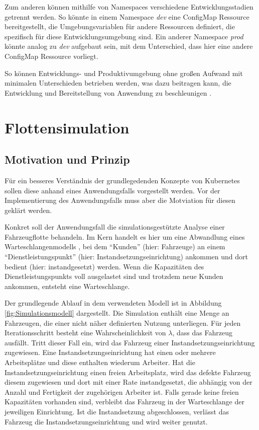 \documentclass[11pt,a4paper]{article}
\begin{document}
Zum anderen können mithilfe von Namespaces verschiedene Entwicklungsstadien getrennt werden.
So könnte in einem Namespace \emph{dev} eine ConfigMap Ressource bereitgestellt,
die Umgebungsvariablen für andere Ressourcen definiert, die spezifisch für diese 
Entwicklungsumgebung sind. Ein anderer Namespace \emph{prod} könnte analog zu \emph{dev}
aufgebaut sein, mit dem Unterschied, dass hier eine andere ConfigMap Ressource vorliegt.

So können Entwicklungs- und Produktivumgebung ohne großen Aufwand mit minimalen Unterschieden betrieben
werden, was dazu beitragen kann, die Entwicklung und Bereitstellung von Anwendung zu beschleunigen
\cite{Schmeling_Dargatz_2022}.

\section{Flottensimulation}

\subsection{Motivation und Prinzip}
Für ein besseres Verständnis der grundlegedenden Konzepte von Kubernetes sollen diese anhand eines
Anwendungsfalls vorgestellt werden.
Vor der Implementierung des Anwendungsfalls muss aber die Motviation für diesen geklärt werden.

Konkret soll der Anwendungsfall die simulationsgestützte Analyse einer Fahrzeugflotte behandeln.
Im Kern handelt es hier um eine Abwandlung eines Warteschlangenmodells \cite{Leonelli2021}, bei dem
``Kunden'' (hier: Fahrzeuge) an einem ``Dienstleistungspunkt'' (hier: Instandsetzungseinrichtung) ankommen 
und dort bedient (hier: instandgesetzt) werden.
Wenn die Kapazitäten des Dienstleistungspunkts voll ausgelastet sind und trotzdem neue Kunden ankommen, entsteht eine Warteschlange.

Der grundlegende Ablauf in dem verwendeten Modell ist in Abbildung \ref{fig:Simulationsmodell} dargestellt.
Die Simulation enthält eine Menge an Fahrzeugen, die einer nicht näher definierten Nutzung unterliegen. 
Für jeden Iterationsschritt besteht eine Wahrscheinlichkeit von $\lambda$, dass das Fahrzeug ausfällt.
Tritt dieser Fall ein, wird das Fahrzeug einer Instandsetzungseinrichtung zugewiesen. 
Eine Instandsetzungseinrichtung hat einen oder mehrere Arbeitsplätze und diese enthalten wiederum Arbeiter.
Hat die Instandsetzungseinrichtung einen freien Arbeitsplatz, wird das defekte Fahrzeug diesem zugewiesen und
dort mit einer Rate instandgesetzt, die abhängig von der Anzahl und Fertigkeit der zugehörigen Arbeiter ist.
Falls gerade keine freien Kapazitäten vorhanden sind, verbleibt das Fahrzeug in der Warteschlange der jeweiligen Einrichtung.
Ist die Instandsetzung abgeschlossen, verlässt das Fahrzeug die Instandsetzungseinrichtung und wird weiter genutzt.
\end{document}
